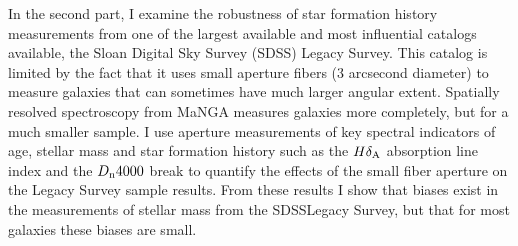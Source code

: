 In the second part, I examine the robustness of star formation history measurements from one of the largest available and most influential catalogs available, the Sloan Digital Sky Survey (SDSS) Legacy Survey. This catalog is limited by the fact that it uses small aperture fibers (3 arcsecond diameter) to measure galaxies that can sometimes have much larger angular extent. Spatially resolved spectroscopy from MaNGA measures galaxies more completely, but for a much smaller sample. I use aperture measurements of key spectral indicators of age, stellar mass and star formation history such as the $H \delta_{\rm A}$ absorption line index and the $D_{\rm n}4000$ break to quantify the effects of the small fiber aperture on the Legacy Survey sample results. From these results I show that biases exist in the measurements of stellar mass from the SDSSLegacy Survey, but that for most galaxies these biases are small.\\